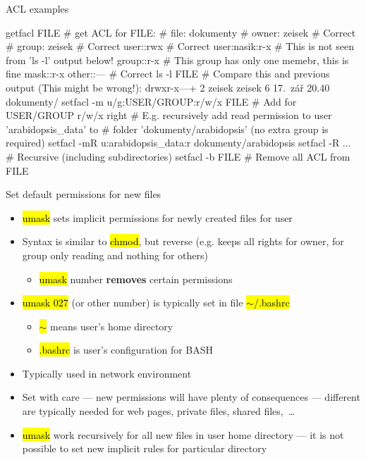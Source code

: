 \documentclass[compress, ucs, xelatex, 11pt, xcolor=svgnames,
  hyperref={
    bookmarks=true,
    unicode=true,
    colorlinks=true,
    pdftitle={Linux, command line and MetaCentrum},
    plainpages=false,
    pdfauthor={Vojtech Zeisek},
    pdfsubject={Course about use of Linux command line, writing shell scripts and using MetaCentrum of CESNET},
    pdfcreator={XeLaTeX},
    pdfkeywords={Linux, GNU, BASH, shell, command line, MetaCentrum},
    linkcolor=DarkRed,
    anchorcolor=DarkBlue,
    citecolor=Indigo,
    filecolor=NavyBlue,
    menucolor=DarkMagenta,
    urlcolor=DarkBlue,
    pdftex},
  url={hyphens, lowtilde} %
  ]{beamer}
\renewcommand{\texttt}[1]{\hl{\ttfamily #1}}
\begin{document}
\begin{frame}[fragile]{ACL examples}
  \begin{bashcode}
    getfacl FILE # get ACL for FILE:
    # file: dokumenty
    # owner: zeisek # Correct
    # group: zeisek # Correct
    user::rwx       # Correct
    user:nasik:r-x  # This is not seen from 'ls -l' output below!
    group::r-x      # This group has only one memebr, this is fine
    mask::r-x
    other::---      # Correct
    ls -l FILE # Compare this and previous output (This might be wrong!):
    drwxr-x---+  2 zeisek zeisek     6 17. zář 20.40 dokumenty/
    setfacl -m u/g:USER/GROUP:r/w/x FILE # Add for USER/GROUP r/w/x right
    # E.g. recursively add read permission to user 'arabidopsis_data' to
    # folder 'dokumenty/arabidopsis' (no extra group is required)
    setfacl -mR u:arabidopsis_data:r dokumenty/arabidopsis
    setfacl -R ... # Recursive (including subdirectories)
    setfacl -b FILE # Remove all ACL from FILE
  \end{bashcode}
\end{frame}

\begin{frame}{Set default permissions for new files}
  \begin{itemize}
    \item \texttt{umask} sets implicit permissions for newly created files for user
    \item Syntax is similar to \texttt{chmod}, but reverse (e.g. \texttt{027} keeps all rights for owner, for group only reading and nothing for others)
    \begin{itemize}
      \item \texttt{umask} number \textbf{removes} certain permissions
    \end{itemize}
    \item \texttt{umask 027} (or other number) is typically set in file \texttt{$\sim$/.bashrc}
    \begin{itemize}
      \item \texttt{$\sim$} means user's home directory
      \item \texttt{.bashrc} is user's configuration for BASH
    \end{itemize}
    \item Typically used in network environment
    \item Set with care --- new permissions will have plenty of consequences --- different are typically needed for web pages, private files, shared files,~\ldots
    \item \texttt{umask} work recursively for all new files in user home directory --- it is not possible to set new implicit rules for particular directory
  \end{itemize}
\end{frame}
\end{document}

